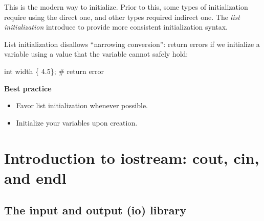 \documentclass[
  letterpaper,
  DIV=11,
  numbers=noendperiod]{scrreprt}
\newenvironment{Shaded}{\begin{snugshade}}{\end{snugshade}}
\newcommand{\CommentTok}[1]{\textcolor[rgb]{0.37,0.37,0.37}{#1}}
\newcommand{\FloatTok}[1]{\textcolor[rgb]{0.68,0.00,0.00}{#1}}
\newcommand{\NormalTok}[1]{\textcolor[rgb]{0.00,0.23,0.31}{#1}}
\providecommand{\tightlist}{%
  \setlength{\itemsep}{0pt}\setlength{\parskip}{0pt}}\usepackage{longtable,booktabs,array}
\begin{document}
This is the modern way to initialize. Prior to this, some types of
initialization require using the direct one, and other types required
indirect one. The \emph{list initialization} introduce to provide more
consistent initialization syntax.

List initialization disallows ``narrowing conversion'': return errors if
we initialize a variable using a value that the variable cannot safely
hold:

\begin{Shaded}
\begin{Highlighting}[]
\NormalTok{int width \{ }\FloatTok{4.5}\NormalTok{\};   }\CommentTok{\# return error}
\end{Highlighting}
\end{Shaded}

\begin{tcolorbox}[enhanced jigsaw, toprule=.15mm, rightrule=.15mm, opacityback=0, breakable, leftrule=.75mm, colback=white, colframe=quarto-callout-tip-color-frame, arc=.35mm, left=2mm, bottomrule=.15mm]
\begin{minipage}[t]{5.5mm}
\textcolor{quarto-callout-tip-color}{\faLightbulb}
\end{minipage}%
\begin{minipage}[t]{\textwidth - 5.5mm}

\textbf{Best practice}\vspace{2mm}

\begin{itemize}
\tightlist
\item
  Favor list initialization whenever possible.
\item
  Initialize your variables upon creation.
\end{itemize}

\end{minipage}%
\end{tcolorbox}

\hypertarget{introduction-to-iostream-cout-cin-and-endl}{%
\section{Introduction to iostream: cout, cin, and
endl}\label{introduction-to-iostream-cout-cin-and-endl}}

\hypertarget{the-input-and-output-io-library}{%
\subsection{The input and output (io)
library}\label{the-input-and-output-io-library}}
\end{document}
